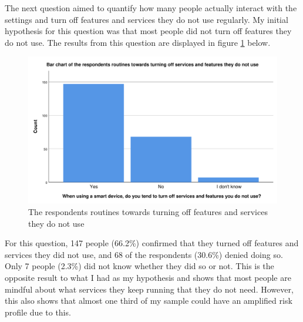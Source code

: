 The next question aimed to quantify how many people actually interact with the settings and turn off features and services they do not use regularly. My initial hypothesis for this question was that most people did not turn off features they do not use. The results from this question are displayed in figure \ref{fig:turn_off_features} below. 
\begin{figure}[!h]
    \centering
    \includegraphics[scale=0.55]{figures/diagrams/turn_off_features.pdf}
    \caption{The respondents routines towards turning off features and services they do not use}
    \label{fig:turn_off_features}
\end{figure}
For this question, 147 people (66.2\%) confirmed that they turned off features and services they did not use, and 68 of the respondents (30.6\%) denied doing so. Only 7 people (2.3\%) did not know whether they did so or not. This is the opposite result to what I had as my hypothesis and shows that most people are mindful about what services they keep running that they do not need. However, this also shows that almost one third of my sample could have an amplified risk profile due to this. 

